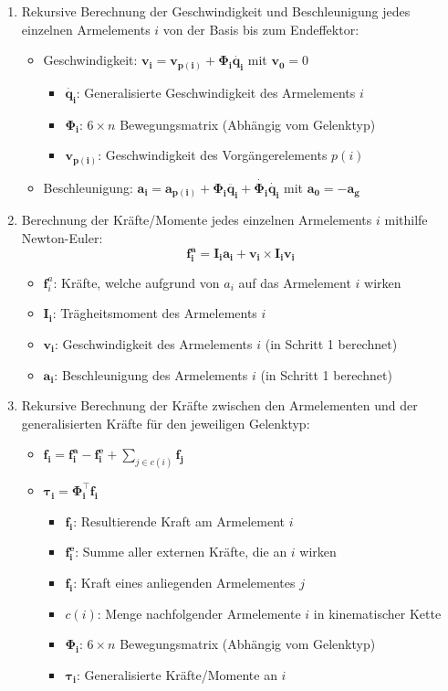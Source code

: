 \begin{enumerate}
	\item Rekursive Berechnung der Geschwindigkeit und Beschleunigung jedes einzelnen Armelements $i$ von der Basis bis zum Endeffektor:
	\begin{itemize}
		\item Geschwindigkeit: $\mathbf{v_i}=\mathbf{v_{p(i)}}+\boldsymbol{\Phi_i}\mathbf{\dot{q_i}}$ mit $\mathbf{v_0}=0$
		\begin{itemize}
			\item $\mathbf{\dot{q_i}}$: Generalisierte Geschwindigkeit des Armelements $i$
			\item $\boldsymbol{\Phi_i}$: $6\times n$ Bewegungsmatrix (Abhängig vom Gelenktyp)
			\item $\mathbf{v_{p(i)}}$: Geschwindigkeit des Vorgängerelements $p(i)$
		\end{itemize}
		\item Beschleunigung: $\mathbf{a_i}=\mathbf{a_{p(i)}}+\boldsymbol{\Phi_i}\mathbf{\ddot{q_i}}+\boldsymbol{\dot{\Phi_i}}\mathbf{\dot{q_i}}$ mit $\mathbf{a_0}=-\mathbf{a_g}$
	\end{itemize}
	\item Berechnung der Kräfte/Momente jedes einzelnen Armelements $i$ mithilfe Newton-Euler:
	$$\mathbf{f_i^a}=\mathbf{I_ia_i}+\mathbf{v_i}\times\mathbf{I_iv_i}$$
	\begin{itemize}
		\item $\mathbf{f}_i^a$: Kräfte, welche aufgrund von $a_i$ auf das Armelement $i$ wirken
		\item $\mathbf{I_i}$: Trägheitsmoment des Armelements $i$
		\item $\mathbf{v_i}$: Geschwindigkeit des Armelements $i$ (in Schritt 1 berechnet)
		\item $\mathbf{a_i}$: Beschleunigung des Armelements $i$ (in Schritt 1 berechnet)
	\end{itemize}
	\item Rekursive Berechnung der Kräfte zwischen den Armelementen und der generalisierten Kräfte für den jeweiligen Gelenktyp:
	\begin{itemize}
		\item $\mathbf{f_i}=\mathbf{f_i^a}-\mathbf{f_i^e}+\sum\limits_{j\in c(i)}\mathbf{f_j}$
		\item $\boldsymbol{\tau_i}=\boldsymbol{\Phi_i^\top}\mathbf{f_i}$
		\begin{itemize}
			\item $\mathbf{f_i}$: Resultierende Kraft am Armelement $i$
			\item $\mathbf{f_i^e}$: Summe aller externen Kräfte, die an $i$ wirken
			\item $\mathbf{f_i}$: Kraft eines anliegenden Armelementes $j$
			\item $c(i)$: Menge nachfolgender Armelemente $i$ in kinematischer Kette
			\item $\boldsymbol{\Phi_i}$: $6\times n$ Bewegungsmatrix (Abhängig vom Gelenktyp)
			\item $\boldsymbol{\tau_i}$: Generalisierte Kräfte/Momente an $i$
		\end{itemize}
	\end{itemize}
\end{enumerate}

